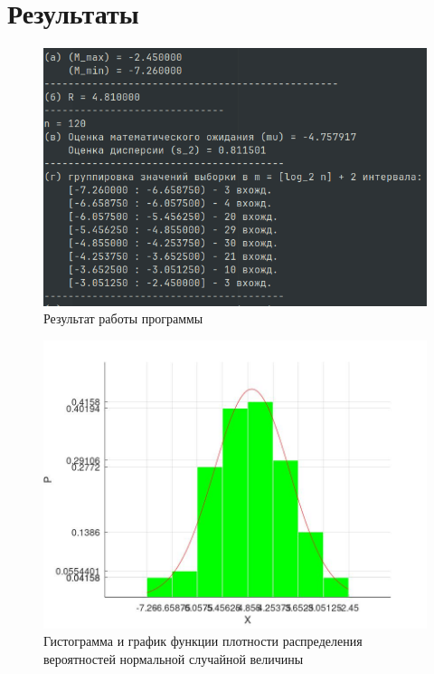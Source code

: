 \chapter{Результаты}

\begin{figure}[ht!]
	\begin{center}
		\includegraphics[scale=0.5]{assets/launch.png}
		\caption{Результат работы программы}
	\end{center}
\end{figure}

\begin{figure}[ht!]
	\begin{center}
		\includegraphics[scale=0.4]{assets/hist.jpg}
		\caption{Гистограмма и график функции плотности распределения вероятностей нормальной случайной величины}
	\end{center}
\end{figure}

